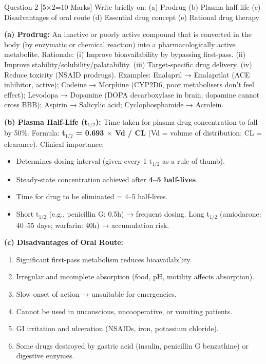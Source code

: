 \documentclass[11pt,a4paper]{article}
\begin{document}
\begin{qbox}{Question 2 [5$\times$2=10 Marks]}
Write briefly on: (a) Prodrug \quad (b) Plasma half life \quad (c) Disadvantages of oral route \quad (d) Essential drug concept \quad (e) Rational drug therapy
\end{qbox}

\begin{ansbox}
\textbf{(a) Prodrug:}
An inactive or poorly active compound that is converted in the body (by enzymatic or chemical reaction) into a pharmacologically active metabolite. Rationale: (i) Improve bioavailability by bypassing first-pass. (ii) Improve stability/solubility/palatability. (iii) Target-specific drug delivery. (iv) Reduce toxicity (NSAID prodrugs). Examples: Enalapril → Enalaprilat (ACE inhibitor, active); Codeine → Morphine (CYP2D6, poor metabolisers don't feel effect); Levodopa → Dopamine (DOPA decarboxylase in brain; dopamine cannot cross BBB); Aspirin → Salicylic acid; Cyclophosphamide → Acrolein.

\textbf{(b) Plasma Half-Life (t$_{1/2}$):}
Time taken for plasma drug concentration to fall by 50\%. Formula: \textbf{t$_{1/2}$ = 0.693 $\times$ Vd / CL} (Vd = volume of distribution; CL = clearance). Clinical importance:
\begin{itemize}[leftmargin=*]
    \item Determines dosing interval (given every 1 t$_{1/2}$ as a rule of thumb).
    \item Steady-state concentration achieved after \textbf{4--5 half-lives}.
    \item Time for drug to be eliminated = 4--5 half-lives.
    \item Short t$_{1/2}$ (e.g., penicillin G: 0.5h) → frequent dosing. Long t$_{1/2}$ (amiodarone: 40--55 days; warfarin: 40h) → accumulation risk.
\end{itemize}

\textbf{(c) Disadvantages of Oral Route:}
\begin{enumerate}[leftmargin=*]
    \item Significant first-pass metabolism reduces bioavailability.
    \item Irregular and incomplete absorption (food, pH, motility affects absorption).
    \item Slow onset of action → unsuitable for emergencies.
    \item Cannot be used in unconscious, uncooperative, or vomiting patients.
    \item GI irritation and ulceration (NSAIDs, iron, potassium chloride).
    \item Some drugs destroyed by gastric acid (insulin, penicillin G benzathine) or digestive enzymes.
\end{enumerate}


\end{ansbox}
\end{document}
